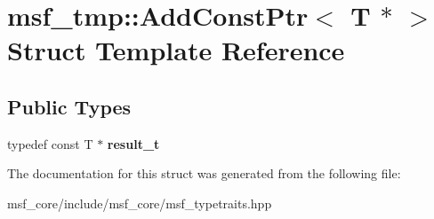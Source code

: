 \hypertarget{structmsf__tmp_1_1AddConstPtr_3_01T_01_5_01_4}{\section{msf\-\_\-tmp\-:\-:Add\-Const\-Ptr$<$ T $\ast$ $>$ Struct Template Reference}
\label{structmsf__tmp_1_1AddConstPtr_3_01T_01_5_01_4}
}
\subsection*{Public Types}
\begin{DoxyCompactItemize}
\item 
\hypertarget{structmsf__tmp_1_1AddConstPtr_3_01T_01_5_01_4_a37edeecdf949a9568898ba136d433f53}{typedef const T $\ast$ {\bfseries result\-\_\-t}}\label{structmsf__tmp_1_1AddConstPtr_3_01T_01_5_01_4_a37edeecdf949a9568898ba136d433f53}

\end{DoxyCompactItemize}


The documentation for this struct was generated from the following file\-:\begin{DoxyCompactItemize}
\item 
msf\-\_\-core/include/msf\-\_\-core/msf\-\_\-typetraits.\-hpp\end{DoxyCompactItemize}

